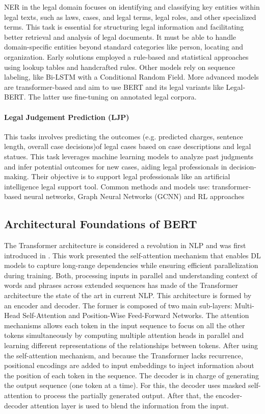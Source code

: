 \documentclass[onecolumn, journal, english, 12pt, a4paper]{IEEEtran} %
\theoremstyle{definition}
\begin{document}
NER in the legal domain focuses on identifying and classifying key
entities within legal texts, such as laws, cases, and legal terms,
legal roles, and other specialized terms. This task is essential for
structuring legal information and facilitating better retrieval and
analysis of legal documents. It must be able to handle domain-specific
entities beyond standard categories like person, locating and
organization. Early solutions employed a rule-based and statistical
approaches using lookup tables and handcrafted rules. Other models
rely on sequence labeling, like Bi-LSTM with a Conditional Random
Field. More advanced models are transformer-based and aim to use BERT
and its legal variants like Legal-BERT. The latter use fine-tuning on
annotated legal corpora\cite{Ariai2024}.

\paragraph{Legal Judgement Prediction (LJP)}
This tasks involves predicting the outcomes (e.g. predicted charges,
sentence length, overall case decisions)of legal cases based on
case descriptions and legal statues. This task leverages machine
learning models to analyze past judgments and infer potential outcomes
for new cases, aiding legal professionals in
decision-making. Their objective is to support legal professionals
like an artificial intelligence legal support tool.  Common methods
and models use: transformer-based neural networks, Graph Neural
Networks (GCNN) and RL approaches\cite{Ariai2024}


\subsection{Architectural Foundations of BERT}
\label{sec:arch-fond-bert}

The Transformer architecture is considered a revolution in NLP and was
first introduced in \cite{vaswani2017attention}. This work presented
the self-attention mechanism that enables DL models to capture
long-range dependencies while ensuring efficient parallelization during
training. Both, processing inputs in parallel and understanding
context of words and phrases across extended sequences has made of the
Transformer architecture the state of the art in current NLP. This
architecture is formed by an encoder and decoder. The former is
composed of two main sub-layers: Multi-Head Self-Attention and
Position-Wise Feed-Forward Networks. The attention mechanisms allows
each token in the input sequence to focus on all the other tokens
simultaneously by computing multiple attention heads in parallel and
learning different representations of the relationships between
tokens. After using the self-attention mechanism, and because the
Transformer lacks recurrence, positional encodings are added to input
embeddings to inject information about the position of each token in
the sequence. The decoder is in charge of generating the output
sequence (one token at a time). For this, the decoder uses masked
self-attention to process the partially generated output. After that,
the encoder-decoder attention layer is used to blend the information
from the input. 
\end{document}
